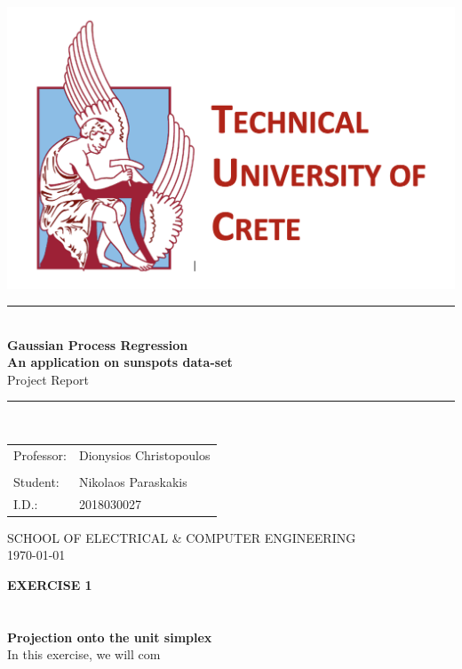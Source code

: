 \documentclass[12pt,a4paper]{article}
\newcommand{\boldmark}[1]{\noindent\textbf{#1}\\ }
\begin{document}
\begin{titlepage}

	\begin{center}

		\includegraphics[scale=0.5] {tuc_logo_text.png} \\[3cm]

		\large
		\rule{0.8\textwidth}{2pt} \\[0.5cm]
		
		\textbf{\Large{Gaussian Process Regression}} \\[0.5cm]
		\textbf{\Large{An application on sunspots data-set}} \\[1.5cm]
		{\Large{Project Report}} \\[0.1cm]
		\rule{0.8\textwidth}{2pt} \\[4cm]
		
		\begin{tabular}{l l}
		    \large{Professor:} & \large{Dionysios Christopoulos}\\\\
			\large{Student:} & \large{Nikolaos Paraskakis} \\
			\large{I.D.:} & \large{2018030027} \\
		\end{tabular}
		
		\vspace{5cm}
		\textmd{\large{SCHOOL OF ELECTRICAL \& COMPUTER ENGINEERING}} \\[0.5cm]
		\today \\
		
	\end{center}
		
\end{titlepage}





\noindent
\boldmark{\Large{EXERCISE 1}}

\noindent
\textbf{\\\\Projection onto the unit simplex}\\

\noindent
In this exercise, we will com
\end{document}
